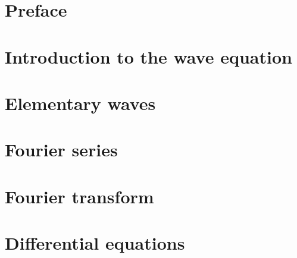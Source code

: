 \documentclass[a4paper,12pt]{book}
\theoremstyle{plain}
\theoremstyle{plain}
\theoremstyle{plain}
\theoremstyle{plain}
\theoremstyle{definition}
\theoremstyle{definition}
\begin{document}
\tableofcontents
\glsaddallunused
\printglossary[title=Symbols and Notation]
\chapter*{Preface}

\mainmatter
\pagestyle{fancy}
\chapter{Introduction to the wave equation}
\label{chap:wave-eq}

\vfill\pagebreak

\shipoutAnswer
\chapter{Elementary waves}
\label{chap:elementary-waves}

\vfill\pagebreak

\shipoutAnswer
\chapter{Fourier series}
\label{chap:series}

\vfill\pagebreak

\shipoutAnswer
\vfill\pagebreak

\shipoutAnswer
\chapter{Fourier transform}
\label{chap:transform}

\vfill\pagebreak

\shipoutAnswer
\chapter{Differential equations}

\vfill\pagebreak

\shipoutAnswer
\end{document}
